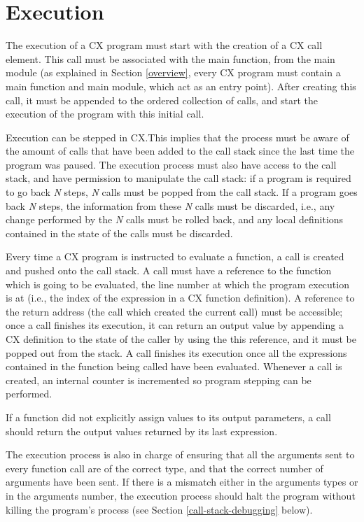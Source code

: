 \chapter{Execution}
\label{execution}

The execution of a CX program must start with the creation of a CX
call element. This call must be associated with the main function,
from the main module (as explained in Section \ref{overview}, every CX
program must contain a main function and main module, which act as an
entry point). After creating this call, it must be appended to the
ordered collection of calls, and start the execution of the program
with this initial call.

Execution can be stepped in CX.\@ This implies that the process must be
aware of the amount of calls that have been added to the call stack
since the last time the program was paused. The execution process must
also have access to the call stack, and have permission to manipulate
the call stack: if a program is required to go back \textit{N} steps,
\textit{N} calls must be popped from the call stack. If a program goes
back \textit{N} steps, the information from these \textit{N} calls
must be discarded, i.e., any change performed by the \textit{N} calls
must be rolled back, and any local definitions contained in the state
of the calls must be discarded.

Every time a CX program is instructed to evaluate a function, a call
is created and pushed onto the call stack. A call must have a
reference to the function which is going to be evaluated, the line
number at which the program execution is at (i.e., the index of the
expression in a CX function definition). A reference to the return
address (the call which created the current call) must be accessible;
once a call finishes its execution, it can return an output value by
appending a CX definition to the state of the caller by using the
this reference, and it must be popped out from the stack. A call
finishes its execution once all the expressions contained in
the function being called have been evaluated. Whenever a call is
created, an internal counter is incremented so program stepping can be
performed.

If a function did not explicitly assign values to its output
parameters, a call should return the output values returned by its
last expression.

The execution process is also in charge of ensuring that all the
arguments sent to every function call are of the correct type, and that
the correct number of arguments have been sent. If there is a mismatch
either in the arguments types or in the arguments number, the
execution process should halt the program without killing the
program's process (see Section \ref{call-stack-debugging} below).

